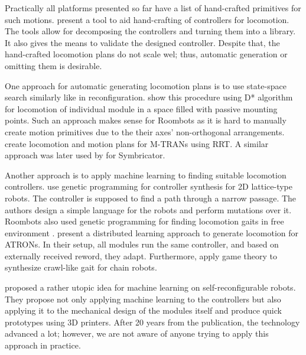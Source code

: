 Practically all platforms presented so far have a list of hand-crafted
primitives for such motions. \textcite{DBLP:conf/isrr/TosunJKY15} present a tool
to aid hand-crafting of controllers for locomotion. The tools allow for
decomposing the controllers and turning them into a library. It also gives the
means to validate the designed controller. Despite that, the hand-crafted
locomotion plans do not scale wel; thus, automatic generation or
omitting them is desirable.

One approach for automatic generating locomotion plans is to use state-space
search similarly like in reconfiguration.
\textcite{DBLP:conf/robotik/BonardiMSVI12} show this procedure using D*
algorithm for locomotion of individual module in a space filled with passive
mounting points. Such an approach makes sense for Roombots as it is hard to
manually create motion primitives due to the their axes' non-orthogonal
arrangements. \textcite{DBLP:conf/dars/YoshidaKKMTK04} create locomotion and
motion plans for M-TRANs using RRT. A similar approach was later used by
\textcite{DBLP:conf/taros/VonasekKP12} for Symbricator.

Another approach is to apply machine learning to finding suitable locomotion
controllers. \textcite{DBLP:conf/eh/BennettR00} use genetic programming for
controller synthesis for 2D lattice-type robots. The controller is supposed to
find a path through a narrow passage. The authors design a simple language for
the robots and perform mutations over it. Roombots also used genetic programming
for finding locomotion gaits in free environment \cite{aydn_2010,
DBLP:journals/procedia/PouyaAMI11}. \textcite{DBLP:journals/ras/ChristensenSS13}
present a distributed learning approach to generate locomotion for ATRONs. In
their setup, all modules run the same controller, and based on externally
received reword, they adapt. Furthermore, \textcite{DBLP:conf/iros/DuttaDN17}
apply game theory to synthesize crawl-like gait for chain robots.

\textcite{DBLP:conf/icra/LipsonP00} proposed a rather utopic idea for machine
learning on self-reconfigurable robots. They propose not only applying machine
learning to the controllers but also applying it to the mechanical design of
the modules itself and produce quick prototypes using 3D printers. After 20
years from the publication, the technology advanced a lot; however, we are not
aware of anyone trying to apply this approach in practice.

